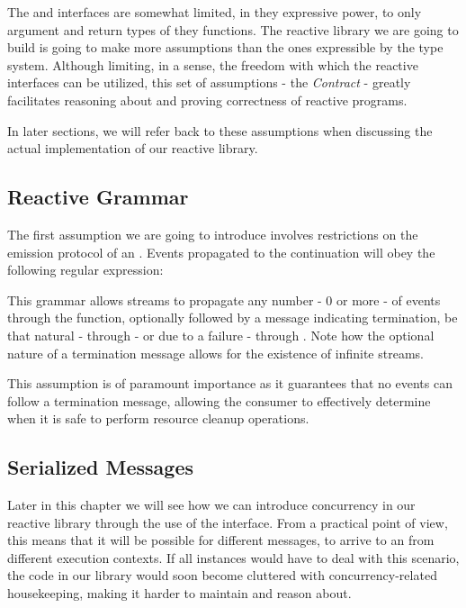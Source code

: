 The  and  interfaces are somewhat limited, in they expressive power, to only argument and return types of they functions. The reactive library we are going to build is going to make more assumptions than the ones expressible by the type system. Although limiting, in a sense, the freedom with which the reactive interfaces can be utilized, this set of assumptions - the \textit{Contract} - greatly facilitates reasoning about and proving correctness of reactive programs\cite{MS2010-RxDesign}.

In later sections, we will refer back to these assumptions when discussing the actual implementation of our reactive library.

\subsection{Reactive Grammar}
\label{ass-grammar}
The first assumption we are going to introduce involves restrictions on the emission protocol of an . Events propagated to the  continuation will obey the following regular expression:

\begin{center}\end{center}

This grammar allows streams to propagate any number - 0 or more - of events through the  function, optionally followed by a message indicating termination, be that natural - through  - or due to a failure - through . Note how the optional nature of a termination message allows for the existence of infinite streams. 

This assumption is of paramount importance as it guarantees that no events can follow a termination message, allowing the consumer to effectively determine when it is safe to perform resource cleanup operations. 

\subsection{Serialized Messages}
\label{ass-serialized}
Later in this chapter we will see how we can introduce concurrency in our reactive library through the use of the  interface. From a practical point of view, this means that it will be possible for different messages, to arrive to an  from different execution contexts. If all  instances would have to deal with this scenario, the code in our library would soon become cluttered with concurrency-related housekeeping, making it harder to maintain and reason about.

